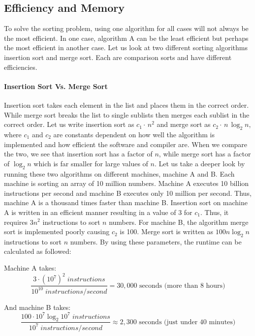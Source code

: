 \documentclass[12pt]{article}
\begin{document}
	\subsection{Efficiency and Memory}
	
	To solve the sorting problem, using one algorithm for all cases will not always be the most efficient.
	In one case, algorithm A can be the least efficient but perhaps the most efficient in another case.
	Let us look at two different sorting algorithms insertion sort and merge sort.
	Each are comparison sorts and have different efficiencies.
	
	\paragraph{Insertion Sort Vs. Merge Sort}
	
	Insertion sort takes each element in the list and places them in the correct order.
	While merge sort breaks the list to single sublists then merges each sublist in the correct order.
	Let us write insertion sort as $c_1 \cdot\,n^2$ and merge sort as $c_2 \cdot\,n\,\log_2{n}$, where $c_1$ and $c_2$ are constants dependent on how well the algorithm is implemented and how efficient the software and compiler are.
	When we compare the two, we see that insertion sort has a factor of $n$, while merge sort has a factor of $\log_2{n}$ which is far smaller for large values of $n$.
	Let us take a deeper look by running these two algorithms on different machines, machine A and B.
	Each machine is sorting an array of 10 million numbers.
	Machine A executes 10 billion instructions per second and machine B executes only 10 million per second.
	Thus, machine A is a thousand times faster than machine B.
	Insertion sort on machine A is written in an efficient manner resulting in a value of 3 for $c_1$.
	Thus, it requires $3n^2$ instructions to sort $n$ numbers.
	For machine B, the algorithm merge sort is implemented poorly causing $c_2$ is 100.
	Merge sort is written as $100 n\log_2{n}$ instructions to sort $n$ numbers.
	By using these parameters, the runtime can be calculated as followed:
	
	Machine A takes:
	\begin{equation}
	\frac{3\cdot(10^7)^2 \;instructions}{10^{10} \;instructions/\!second}=30,000\mbox{ seconds (more than 8 hours)}
	\end{equation}
	
	And machine B takes:
	\begin{equation}	
	\frac{100\cdot 10^7\log_2{10^7}\;instructions}{10^{7} \;instructions/\!second}\approx2,300\mbox{ seconds (just under 40 minutes)}
	\end{equation}
	
\end{document}
